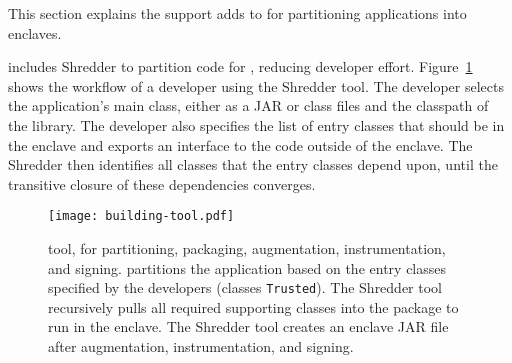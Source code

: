 \label{sec:concept}


This section explains the support \sysname{} adds to \java{}
for partitioning applications into \sgx{} enclaves.

\label{sec:concept:partition}


\sysname{} includes Shredder to 
 partition \java{} code for \sgx{},
reducing developer effort.
Figure~\ref{fig:builder} shows the workflow of a developer using the \sysname{} Shredder tool.
The developer selects the application's main class, either as a JAR or class files
and the classpath of the library.
The developer also specifies the list of
entry classes that should be in the enclave and exports an interface to the code 
outside of the enclave.
The Shredder then
identifies all classes that the entry classes depend upon,
until the transitive closure of these dependencies converges.

\begin{figure}[t!]
\centering
\texttt{[image: building-tool.pdf]}
\caption{\sysname{} \staticphase{} tool, for partitioning, packaging, augmentation, instrumentation, and signing.
\sysname{} partitions the \java{} application based on the entry classes
specified by the developers (classes {\tt Trusted}).
The Shredder tool recursively pulls all required supporting classes into the 
package to run in the enclave.
The Shredder tool creates an enclave JAR file after augmentation,
instrumentation, and signing.}
\label{fig:builder}
\end{figure}

